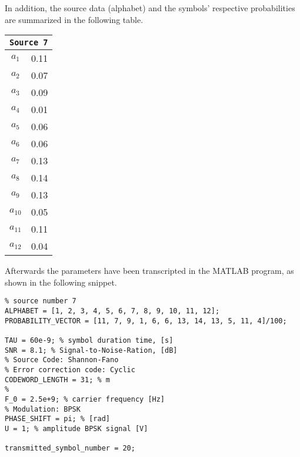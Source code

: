 \noindent In addition, the source data (alphabet) and the symbols' respective probabilities are summarized in the following table.
\begin{table}[h!]
    \centering
    \begin{tabular}{|c|c|}
        \hline
        \multicolumn{2}{|c|}{\texttt{Source 7}} \\\hline\hline
        $ a_1 $ & 0.11 \\
        $ a_2 $ & 0.07 \\
        $ a_3 $ & 0.09 \\
        $ a_4 $ & 0.01 \\
        $ a_5 $ & 0.06 \\
        $ a_6 $ & 0.06 \\
        $ a_7 $ & 0.13 \\
        $ a_8 $ & 0.14 \\
        $ a_9 $ & 0.13 \\
        $ a_{10} $ & 0.05 \\
        $ a_{11} $ & 0.11 \\
        $ a_{12} $ & 0.04 \\\hline
    \end{tabular}
    \label{tab:source7}
\end{table}

\noindent Afterwards the parameters have been transcripted in the MATLAB program, as shown in the following snippet. 

\begin{lstlisting}
% source number 7
ALPHABET = [1, 2, 3, 4, 5, 6, 7, 8, 9, 10, 11, 12];
PROBABILITY_VECTOR = [11, 7, 9, 1, 6, 6, 13, 14, 13, 5, 11, 4]/100;

TAU = 60e-9; % symbol duration time, [s]
SNR = 8.1; % Signal-to-Noise-Ration, [dB]
% Source Code: Shannon-Fano
% Error correction code: Cyclic
CODEWORD_LENGTH = 31; % m
% 
F_0 = 2.5e+9; % carrier frequency [Hz]
% Modulation: BPSK
PHASE_SHIFT = pi; % [rad]
U = 1; % amplitude BPSK signal [V]

transmitted_symbol_number = 20;
\end{lstlisting}





\setcounter{secnumdepth}{1}

